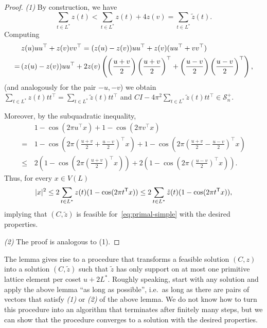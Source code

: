 \documentclass{amsart}
\begin{document}
\begin{proof}
	\textit{(1)}
	By construction, we have
	\[
	 \sum_{t \in L^*} z(t) < \sum_{t \in L^*} z(t)+ 4z(v) =  \sum_{t \in L^*} \tilde{z}(t) .
	\]
	Computing
	\begin{align*}
		& z(u)uu^{\sf{\top}} + z(v) vv^{\sf{\top}} =  (z(u)-z(v)) uu^{\sf{\top}} + z(v) (uu^\mathsf{\top}+ vv^\mathsf{\top})   \\
		= \, &(z(u)-z(v)) uu^{\sf{\top}} + 2z(v) \left (\left(\frac{u+v}{2} \right) \left(\frac{u+v}{2}\right)^\mathsf{\top}  +\left(\frac{u-v}{2} \right) \left(\frac{u-v}{2}\right)^\mathsf{\top} \right),
	\end{align*}
	(and analogously for the pair $ -u,-v $) we obtain $ \sum_{t \in L^*} z(t) tt^\mathsf{\top} = \sum_{t \in L^*} \tilde{z}(t) tt^\mathsf{\top} $ and $ CI-4\pi^2 \sum_{t \in L^*} \tilde{z}(t) tt^\mathsf{\top}  \in \mathcal{S}_n^+  $.


	Moreover, by the subquadratic inequality,
	\begin{align*}
		&1-\cos(2\pi u^\mathsf{\top}x) + 1-\cos(2\pi v^\mathsf{\top}x)   \\
		=\, & 1-\cos\left(2\pi  \left(\frac{u+v}{2} + \frac{u-v}{2}\right)^\mathsf{\top}   x\right) + 1-\cos\left(2\pi \left(\frac{u+v}{2} - \frac{u-v}{2}\right)^\mathsf{\top}x\right)  \\
		\le\, & 2 \left(1-\cos\left(2\pi \left(\frac{u+v}{2}\right)^\mathsf{\top}x\right)\right) + 2\left(1-\cos\left(2\pi \left(\frac{u-v}{2}\right)^\mathsf{\top}x\right)\right).
	\end{align*}
	Thus, for every $ x \in V(L) $
	\begin{align*}
		|x|^2 \leq 2 \sum_{t \in L^*} z(t) (1- \cos(2\pi t^{\sf T} x)) \le  2 \sum_{t \in L^*} \tilde{z}(t) (1- \cos(2\pi t^{\sf T} x)),
	\end{align*}
	implying that $ (C,\tilde{z}) $ is feasible for~\eqref{eq:primal-simple} with the desired properties.

	\textit{(2)} The proof is analogous to (1).
\end{proof}

The lemma gives rise to a procedure that transforms a feasible
solution $ (C,z) $ into a solution $ (C,\tilde{z}) $ such that
$ \tilde{z} $ has only support on at most one primitive lattice
element per coset $ u+2L^* $. Roughly speaking, start with any
solution and apply the above lemma ``as long as possible'', i.e.\ as
long as there are pairs of vectors that satisfy \textit{(1)} or
\textit{(2)} of the above lemma. We do not know how to turn this procedure into an algorithm that terminates after finitely many steps,
but we can show that the procedure converges to a solution with the desired properties.
\end{document}
